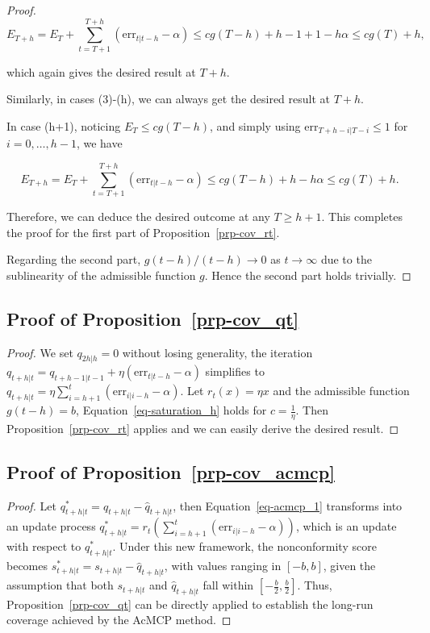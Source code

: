 \documentclass[
  11pt,
  a4paper,
]{article}
\theoremstyle{plain}
\theoremstyle{plain}
\theoremstyle{remark}
\begin{document}
\begin{proof}
\[
E_{T+h} = E_T+\sum_{t=T+1}^{T+h}(\mathrm{err}_{t|t-h}-\alpha) \leq cg(T-h)+h-1+1-h\alpha \leq cg(T)+h,
\]

which again gives the desired result at \(T+h\).

Similarly, in cases (3)-(h), we can always get the desired result at
\(T+h\).

In case (h+1), noticing \(E_T \leq cg(T-h)\), and simply using
\(\mathrm{err}_{T+h-i|T-i} \leq 1\) for \(i=0,\ldots,h-1\), we have

\[
E_{T+h} = E_T+\sum_{t=T+1}^{T+h}(\mathrm{err}_{t|t-h}-\alpha) \leq cg(T-h)+h-h\alpha \leq cg(T)+h.
\]

Therefore, we can deduce the desired outcome at any \(T \geq h+1\). This
completes the proof for the first part of Proposition~\ref{prp-cov_rt}.

Regarding the second part, \(g(t-h)/(t-h) \rightarrow 0\) as
\(t \rightarrow \infty\) due to the sublinearity of the admissible
function \(g\). Hence the second part holds trivially.
\end{proof}

\subsection{\texorpdfstring{Proof of
Proposition~\ref{prp-cov_qt}}{Proof of Proposition~}}\label{sec-proof_cov_qt}

\begin{proof}
We set \(q_{2h|h}=0\) without losing generality, the iteration
\(q_{t+h|t}=q_{t+h-1|t-1}+\eta \left(\mathrm{err}_{t|t-h}-\alpha\right)\)
simplifies to
\(q_{t+h|t}=\eta \sum_{i=h+1}^{t}\left(\mathrm{err}_{i|i-h}-\alpha\right)\).
Let \(r_t(x) = \eta x\) and the admissible function \(g(t-h) = b\),
Equation~\ref{eq-saturation_h} holds for \(c=\frac{1}{\eta}\). Then
Proposition~\ref{prp-cov_rt} applies and we can easily derive the
desired result.
\end{proof}

\subsection{\texorpdfstring{Proof of
Proposition~\ref{prp-cov_acmcp}}{Proof of Proposition~}}\label{sec-proof_cov_acmcp}

\begin{proof}
Let \(q_{t+h|t}^{*}=q_{t+h|t}-\hat{q}_{t+h|t}\), then
Equation~\ref{eq-acmcp_1} transforms into an update process
\(q_{t+h|t}^{*}=r_t\left(\sum_{i=h+1}^t \left(\mathrm{err}_{i|i-h}-\alpha\right)\right)\),
which is an update with respect to \(q_{t+h|t}^{*}\). Under this new
framework, the nonconformity score becomes
\(s_{t+h|t}^{*}=s_{t+h|t}-\hat{q}_{t+h|t}\), with values ranging in
\([-b,b]\), given the assumption that both \(s_{t+h|t}\) and
\(\hat{q}_{t+h|t}\) fall within \([-\frac{b}{2},\frac{b}{2}]\). Thus,
Proposition~\ref{prp-cov_qt} can be directly applied to establish the
long-run coverage achieved by the AcMCP method.
\end{proof}
\end{document}

